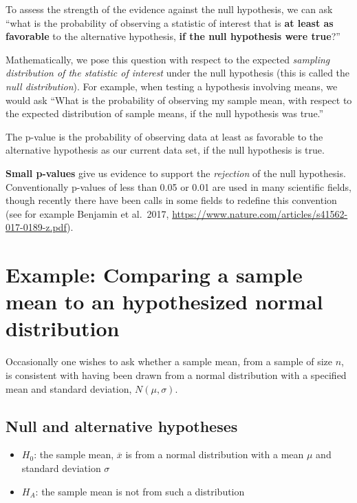 \documentclass[]{book}
\providecommand{\tightlist}{%
  \setlength{\itemsep}{0pt}\setlength{\parskip}{0pt}}
\theoremstyle{definition}
\theoremstyle{definition}
\theoremstyle{definition}
\theoremstyle{remark}
\begin{document}
To assess the strength of the evidence against the null hypothesis, we
can ask ``what is the probability of observing a statistic of interest
that is \textbf{at least as favorable} to the alternative hypothesis,
\textbf{if the null hypothesis were true}?''

Mathematically, we pose this question with respect to the expected
\emph{sampling distribution of the statistic of interest} under the null
hypothesis (this is called the \emph{null distribution}). For example,
when testing a hypothesis involving means, we would ask ``What is the
probability of observing my sample mean, with respect to the expected
distribution of sample means, if the null hypothesis was true.''

\begin{description}
\tightlist
\item[P-value]
The p-value is the probability of observing data at least as favorable
to the alternative hypothesis as our current data set, if the null
hypothesis is true.
\end{description}

\textbf{Small p-values} give us evidence to support the \emph{rejection}
of the null hypothesis. Conventionally p-values of less than 0.05 or
0.01 are used in many scientific fields, though recently there have been
calls in some fields to redefine this convention (see for example
Benjamin et al.~2017,
\url{https://www.nature.com/articles/s41562-017-0189-z.pdf}).

\hypertarget{example-comparing-a-sample-mean-to-an-hypothesized-normal-distribution}{%
\section{Example: Comparing a sample mean to an hypothesized normal
distribution}\label{example-comparing-a-sample-mean-to-an-hypothesized-normal-distribution}}

Occasionally one wishes to ask whether a sample mean, from a sample of
size \(n\), is consistent with having been drawn from a normal
distribution with a specified mean and standard deviation,
\(N(\mu,\sigma)\).

\hypertarget{null-and-alternative-hypotheses-1}{%
\subsection{Null and alternative
hypotheses}\label{null-and-alternative-hypotheses-1}}

\begin{itemize}
\tightlist
\item
  \(H_0\): the sample mean, \(\overline{x}\) is from a normal
  distribution with a mean \(\mu\) and standard deviation \(\sigma\)
\item
  \(H_A\): the sample mean is not from such a distribution
\end{itemize}
\end{document}
